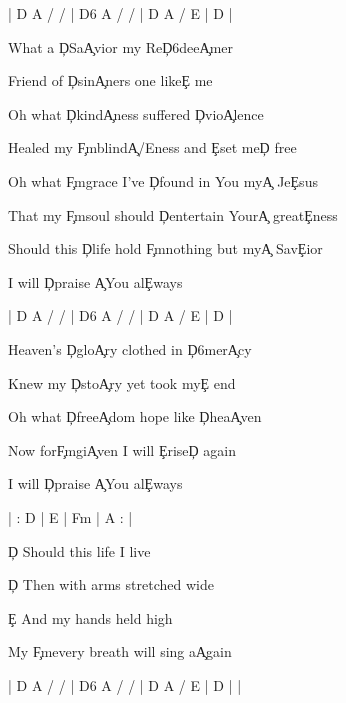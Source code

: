 \documentclass[9pt]{extarticle}
\begin{document}
\bsong

\bi
|  D A / /  |  D6 A / /  |  D A / E  | D |
\ei

\bv
What a \c{D}Sa\c{A}vior my Re\c{D6}dee\c{A}mer

Friend of \c{D}sin\c{A}ners one like\c{E} me

Oh what \c{D}kind\c{A}ness suffered \c{D}vio\c{A}lence

Healed my \c{F\s m}blind\c{A/E}ness and \c{E}set me\c{D} free
\ev

\bc
Oh what \c{F\s m}grace I've \c{D}found in You my\c{A} Je\c{E}sus

That my \c{F\s m}soul should \c{D}entertain Your\c{A} great\c{E}ness

Should this \c{D}life hold \c{F\s m}nothing but my\c{A} Sav\c{E}ior

I will \c{D}praise \c{A}You al\c{E}ways
\ec

\bin
|  D A / /  |  D6 A / /  |  D A / E  | D |
\ein

\bv
Heaven's \c{D}glo\c{A}ry clothed in \c{D6}mer\c{A}cy

Knew my \c{D}sto\c{A}ry yet took my\c{E} end

Oh what \c{D}free\c{A}dom hope like \c{D}hea\c{A}ven

Now for\c{F\s m}gi\c{A}ven I will \c{E}rise\c{D} again
\ev


\bt
I will \c{D}praise \c{A}You al\c{E}ways
\et

\bin
| : D | E | F\s m | A : |
\ein

\bb[3]
\c{D} Should this life I live


\c{D} Then with arms stretched wide

\c{E} And my hands held high

My \c{F\s m}every breath will sing a\c{A}gain
\eb



\bo
|  D A / /  |  D6 A / /  |  D A / E  | D |  |
\eo

\esong
\end{document}
